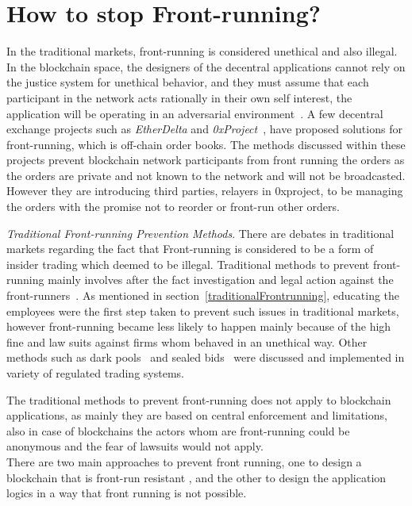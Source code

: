 \section{How to stop Front-running?} %

In the traditional markets, front-running is considered unethical and also illegal. In the blockchain space, the designers of the decentral applications cannot rely on the justice system for unethical behavior, and they must assume that each participant in the network acts rationally in their own self interest, the application will be operating in an adversarial environment~\cite{0xfrontrunning:online}.
A few decentral exchange projects such as \textit{EtherDelta} and \textit{0xProject}~\cite{warren20170x}, have proposed solutions for front-running, which is off-chain order books. The methods discussed within these projects prevent blockchain network participants from front running the orders as the orders are private and not known to the network and will not be broadcasted. However they are introducing third parties, \eg relayers in 0xproject, to be managing the orders with the promise not to reorder or front-run other orders. 

\emph{Traditional Front-running Prevention Methods}. There are debates in traditional markets regarding the fact that Front-running is considered to be a form of insider trading which deemed to be illegal. Traditional methods to prevent front-running mainly involves after the fact investigation and legal action against the front-runners~\cite{LexisNexisLawSuit}. As mentioned in section~\ref{traditionalFrontrunning}, educating the employees were the first step taken to prevent such issues in traditional markets, however front-running became less likely to happen mainly because of the high fine and law suits against firms whom behaved in an unethical way. Other methods such as dark pools~\cite{zhu2014dark, buti2011diving} and sealed bids~\cite{radner1989sealed} were discussed and implemented in variety of regulated trading systems. 

The traditional methods to prevent front-running does not apply to blockchain applications, as mainly they are based on central enforcement and limitations, also in case of blockchains the actors whom are front-running could be anonymous and the fear of lawsuits would not apply. \\

There are two main approaches to prevent front running, one to design a blockchain that is front-run resistant , and the other to design the application logics in a way that front running is not possible. 
